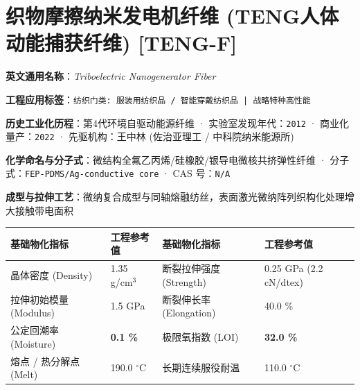 \documentclass[11pt,openright,twoside,UTF8]{ctexbook}
\begin{document}
\section{织物摩擦纳米发电机纤维 (TENG人体动能捕获纤维) [TENG-F]}
\label{sec:teng-f}

\noindent\textbf{英文通用名称}：\textit{Triboelectric Nanogenerator Fiber}\par
\noindent\textbf{工程应用标签}：\texttt{纺织门类: 服装用纺织品 / 智能穿戴纺织品 | 战略特种高性能}\par
\noindent\textbf{历史工业化历程}：第4代环境自驱动能源纤维 · 实验室发现年代：\texttt{2012} · 商业化量产：\texttt{2022} · 先驱机构：王中林 (佐治亚理工 / 中科院纳米能源所)\par
\noindent\textbf{化学命名与分子式}：微结构全氟乙丙烯/硅橡胶/银导电微核共挤弹性纤维 · 分子式：\texttt{FEP-PDMS/Ag-conductive core} · CAS 号：\texttt{N/A}\par
\noindent\textbf{成型与拉伸工艺}：微纳复合成型与同轴熔融纺丝，表面激光微纳阵列织构化处理增大接触带电面积\par

\vspace{0.15cm}
\begin{center}
\small
\begin{tabularx}{\textwidth}{p{3.8cm}Xp{3.8cm}X}
\toprule
\textbf{基础物化指标} & \textbf{工程参考值} & \textbf{基础物化指标} & \textbf{工程参考值} \\
\midrule
晶体密度 (Density) & 1.35 g/cm$^3$ & 断裂拉伸强度 (Strength) & 0.25 GPa (2.2 cN/dtex) \\
拉伸初始模量 (Modulus) & 1.5 GPa & 断裂伸长率 (Elongation) & 40.0 \% \\
公定回潮率 (Moisture) & \textbf{0.1 \%} & 极限氧指数 (LOI) & \textbf{32.0 \%} \\
熔点 / 热分解点 (Melt) & 190.0 $^\circ\mathrm{C}$ & 长期连续服役耐温 & 110.0 $^\circ\mathrm{C}$ \\
\bottomrule
\end{tabularx}
\end{center}
\vspace{0.15cm}
\end{document}
